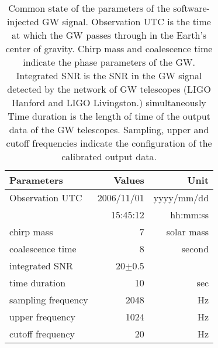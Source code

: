 \documentclass[%
 aps,
 prd,
 amsmath,amssymb,
 reprint,%
superscriptaddress
]{revtex4-1}
\begin{document}
\begin{table}[htb]
  \begin{center}
    \begin{tabular}{|l||r|r|} \hline
     Parameters & Values &Unit \\ \hline \hline
     Observation UTC & 2006/11/01  & yyyy/mm/dd\\
      & 15:45:12 & hh:mm:ss \\
     chirp mass& 7 & solar mass \\
     coalescence time& 8& second\\
     integrated SNR & 20$\pm$0.5 & \\
     time duration& 10 &sec \\
     sampling frequency& 2048 &Hz\\
     upper frequency& 1024 &Hz\\
     cutoff frequency & 20 & Hz\\\hline
    \end{tabular}
  \end{center}
    \caption{Common state of the parameters of the software-injected GW signal. Observation UTC is the time at which the GW passes through in the Earth's center of gravity. Chirp mass and coalescence time indicate the phase parameters of the GW. Integrated SNR is the SNR in the GW signal detected by the network of GW telescopes (LIGO Hanford and LIGO Livingston.) simultaneously Time duration is the length of time of the output data of the GW telescopes. Sampling, upper and cutoff frequencies indicate the configuration of the calibrated output data.\label{server-thesis-tab:2}}
\end{table}
\end{document}
